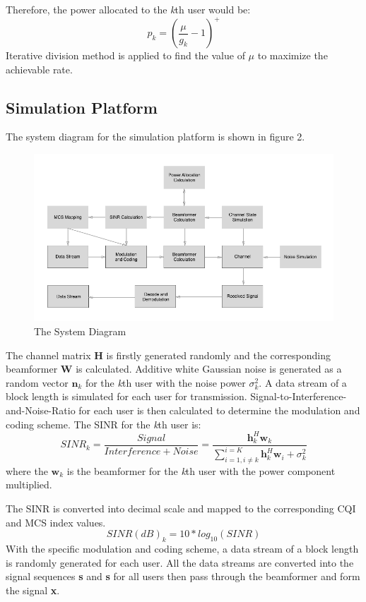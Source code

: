 \documentclass{article}
\begin{document}
\noindent
Therefore, the power allocated to the \textit{k}th user would be:
\[p_k = (\frac{\mu}{g_k}-1)^+ \]
Iterative division method is applied to find the value of $\mu$ to maximize the achievable rate.

\subsection{Simulation Platform}
The system diagram for the simulation platform is shown in figure 2.
\begin{figure}[ht]
\centering
\includegraphics[scale=0.5]{SystemDia.png}
\caption{The System Diagram}
\label{fig:SystemDia}
\end{figure}

\noindent
The channel matrix \textbf{H} is firstly generated randomly and the corresponding beamformer \textbf{W} is calculated.
Additive white Gaussian noise is generated as a random vector $\textbf{n}_k$ for the \textit{k}th user with the noise power $\sigma^2_k$.
A data stream of a block length is simulated for each user for transmission.
Signal-to-Interference-and-Noise-Ratio for each user is then calculated to determine the modulation and coding scheme.
The SINR for the \textit{k}th user is:
\[
SINR_k = \frac{Signal}{Interference+Noise} = \frac{\textbf{h}_k^H\textbf{w}_k}{\sum_{i = 1,i\neq k}^{i = K}\textbf{h}_k^H\textbf{w}_i+\sigma_k^2}
\]
where the $\textbf{w}_k$ is the beamformer for the \textit{k}th user with the power component multiplied.

\noindent
The SINR is converted into decimal scale and mapped to the corresponding CQI and MCS index values.
$$SINR(dB)_k = 10*log_{10}(SINR)$$
With the specific modulation and coding scheme, a data stream of a block length is randomly generated for each user.
All the data streams are converted into the signal sequences \textbf{s}
and \textbf{s} for all users then pass through the beamformer and form the signal \textbf{x}.
\end{document}
